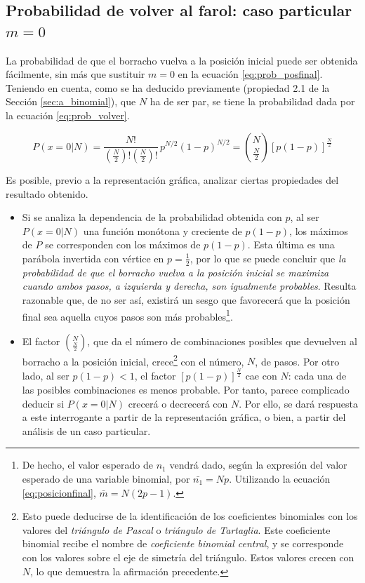 \subsection{Probabilidad de volver al farol: caso particular $m = 0$}
\label{sec:a_volver}

La probabilidad de que el borracho vuelva a la posición inicial puede ser obtenida fácilmente, sin más que sustituir $m = 0$ en la ecuación \ref{eq:prob_posfinal}. Teniendo en cuenta, como se ha deducido previamente (propiedad 2.1 de la Sección \ref{sec:a_binomial}), que $N$ ha de ser par, se tiene la probabilidad dada por la ecuación \ref{eq:prob_volver}.

\begin{equation}
	\boxed{
	P(x=0 | N) = \frac{N!}{\left(\frac{N}{2} \right)! \left(\frac{N}{2} \right)!} \,p^{N/2} (1-p)^{N/2} = \binom{N}{\frac{N}{2}} \left[p(1-p)\right]^\frac{N}{2}
	}
	\label{eq:prob_volver}
\end{equation}

Es posible, previo a la representación gráfica, analizar ciertas propiedades del resultado obtenido.

\begin{itemize}
	\item Si se analiza la dependencia de la probabilidad obtenida con $p$, al ser $P(x=0|N)$ una función monótona y creciente de $p(1-p)$, los máximos de $P$ se corresponden con los máximos de $p(1-p)$. Esta última es una parábola invertida con vértice en $p = \frac{1}{2}$, por lo que se puede concluir que \emph{la probabilidad de que el borracho vuelva a la posición inicial se maximiza cuando ambos pasos, a izquierda y derecha, son igualmente probables}. Resulta razonable que, de no ser así, existirá un sesgo que favorecerá que la posición final sea aquella cuyos pasos son más probables\footnote{De hecho, el valor esperado de $n_1$ vendrá dado, según la expresión del valor esperado de una variable binomial, por $\bar {n_1} = Np$. Utilizando la ecuación \ref{eq:posicionfinal}, $\bar{m} = N (2p-1)$.}.
	\item El factor $\binom{N}{\frac{N}{2}}$, que da el número de combinaciones posibles que devuelven al borracho a la posición inicial, crece\footnote{Esto puede deducirse de la identificación de los coeficientes binomiales con los valores del \textit{triángulo de Pascal} o \textit{triángulo de Tartaglia}. Este coeficiente binomial recibe el nombre de \textit{coeficiente binomial central}, y se corresponde con los valores sobre el eje de simetría del triángulo. Estos valores crecen con $N$, lo que demuestra la afirmación precedente.} con el número, $N$, de pasos. Por otro lado, al ser $p(1-p) < 1$, el factor $[p(1-p)]^{\frac{N}{2}}$ cae con $N$: cada una de las posibles combinaciones es menos probable. Por tanto, parece complicado deducir si $P(x=0|N)$ crecerá o decrecerá con $N$. Por ello, se dará respuesta a este interrogante a partir de la representación gráfica, o bien, a partir del análisis de un caso particular.
\end{itemize}

